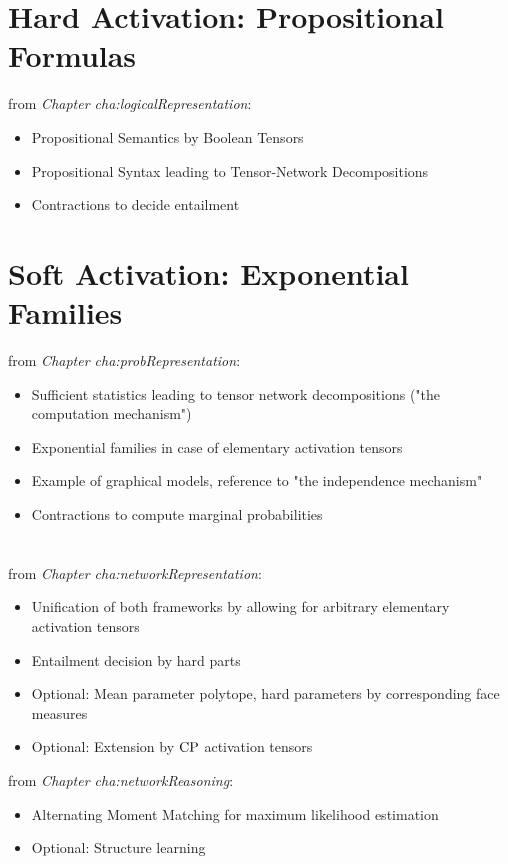 \documentclass[aps,onecolumn,nofootinbib,pra]{article}
\renewcommand{\charef}[1]{\textit{Chapter #1}}
\begin{document}
    \section{Hard Activation: Propositional Formulas}

    from \charef{cha:logicalRepresentation}:
    \begin{itemize}
        \item Propositional Semantics by Boolean Tensors
        \item Propositional Syntax leading to Tensor-Network Decompositions
        \item Contractions to decide entailment
    \end{itemize}


    \section{Soft Activation: Exponential Families}

    from \charef{cha:probRepresentation}:
    \begin{itemize}
        \item Sufficient statistics leading to tensor network decompositions ("the computation mechanism")
        \item Exponential families in case of elementary activation tensors
        \item Example of graphical models, reference to "the independence mechanism"
        \item Contractions to compute marginal probabilities
    \end{itemize}

    \section{\HybridLogicNetworks{}}

    from \charef{cha:networkRepresentation}:
    \begin{itemize}
        \item Unification of both frameworks by allowing for arbitrary elementary activation tensors
        \item Entailment decision by hard parts
        \item Optional: Mean parameter polytope, hard parameters by corresponding face measures
        \item Optional: Extension by $\mathrm{CP}$ activation tensors
    \end{itemize}

    from \charef{cha:networkReasoning}:
    \begin{itemize}
        \item Alternating Moment Matching for maximum likelihood estimation
        \item Optional: Structure learning
    \end{itemize}
\end{document}
